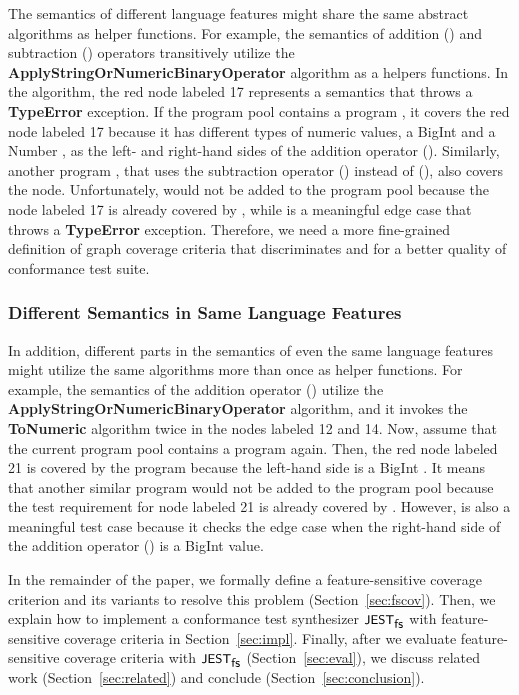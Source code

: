 The semantics of different language features might share the same abstract
algorithms as helper functions.
%
For example, the semantics of addition (\scode{+}) and subtraction (\scode{-})
operators transitively utilize the \textbf{ApplyStringOrNumericBinaryOperator}
algorithm as a helpers functions.
%
In the algorithm, the red node labeled 17 represents a semantics that throws a
\textbf{TypeError} exception.
%
If the program pool contains a program , it covers the red node
labeled 17 because it has different types of numeric values, a BigInt
 and a Number , as the left- and right-hand sides of the
addition operator (\scode{+}).
%
Similarly, another program , that uses the subtraction operator
(\scode{-}) instead of (\scode{+}), also covers the node.
%
Unfortunately,  would not be added to the program pool because
the node labeled 17 is already covered by , while 
is a meaningful edge case that throws a \textbf{TypeError} exception.
%
Therefore, we need a more fine-grained definition of graph coverage criteria
that discriminates  and  for a better quality of
conformance test suite.


\subsubsection{Different Semantics in Same Language
Features}\label{sec:same-feat}

In addition, different parts in the semantics of even the same language features
might utilize the same algorithms more than once as helper functions.
%
For example, the semantics of the addition operator (\scode{+}) utilize the
\textbf{ApplyStringOrNumericBinaryOperator} algorithm, and it invokes the
\textbf{ToNumeric} algorithm twice in the nodes labeled 12 and 14.
%
Now, assume that the current program pool contains a program 
again.
%
Then, the red node labeled 21 is covered by the program  because
the left-hand side is a BigInt .
%
It means that another similar program  would not be added to the
program pool because the test requirement for node labeled 21 is already covered
by .
%
However,  is also a meaningful test case because it checks the
edge case when the right-hand side of the addition operator (\scode{+}) is a
BigInt value.


In the remainder of the paper, we formally define a feature-sensitive coverage
criterion and its variants to resolve this problem (Section~\ref{sec:fscov}).
%
Then, we explain how to implement a conformance test synthesizer $\textsf{\small JEST}_{\textsf{\small fs}}$ with
feature-sensitive coverage criteria in Section~\ref{sec:impl}.
%
Finally, after we evaluate feature-sensitive coverage criteria with $\textsf{\small JEST}_{\textsf{\small fs}}$
(Section~\ref{sec:eval}), we discuss related work (Section~\ref{sec:related})
and conclude (Section~\ref{sec:conclusion}).
